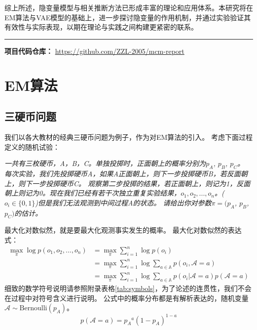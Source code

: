 \documentclass[12pt,a4paper]{article}
\begin{document}
综上所述，隐变量模型与相关推断方法已形成丰富的理论和应用体系。本研究将在EM算法与VAE模型的基础上，进一步探讨隐变量的作用机制，并通过实验验证其有效性与实际表现，以期在理论与实践之间构建更紧密的联系。
\vfill %
\noindent\rule{\textwidth}{0.4pt} %
\begin{center}
    \textbf{项目代码仓库：} \url{https://github.com/ZZL-2005/mcm-report}
\end{center}
\newpage
\section{EM算法}

\subsection{三硬币问题}
我们以各大教材的经典三硬币问题为例子，作为对EM算法的引入。
考虑下面过程定义的随机试验：
\begin{tcolorbox}[
    colback=gray!5,
    colframe=gray!40,
    boxrule=0.5pt,
    arc=3pt,
    left=8pt,
    right=8pt,
    top=6pt,
    bottom=6pt,
    fontupper=\small
]
\textit{
一共有三枚硬币，A，B，C。单独投掷时，正面朝上的概率分别为$p_A$, $p_B$, $p_C$。
每次实验，我们先投掷硬币A，如果A正面朝上，则下一步投掷硬币B，若反面朝上，则下一步投掷硬币C。
观察第二步投掷的结果，若正面朝上，则记为1，反面朝上则记为0。现在我们已经有若干次独立重复实验结果，$o_1,o_2,...,o_n$。($o_i \in \{0,1\}$)但是我们无法观测到中间过程A的状态。
请给出你对参数$\pi =(p_A$, $p_B$, $p_C)$的估计。
}

\end{tcolorbox}
最大化对数似然，就是要最大化观测事实发生的概率。
最大化对数似然的表达式：
\begin{equation}\label{eq:likelihood}
\begin{split}
\max_{\pi}\log p(o_1,o_2,...,o_n) &= \max_{\pi} \sum_{i=1}^n \log p(o_i) \\
&= \max_{\pi} \sum_{i=1}^n \log \sum_{a \in\mathbb{A}}p(o_i,\mathcal{A}=a)\\
&=\max_{\pi} \sum_{i=1}^n \log \sum_{a \in \mathbb{A}}p(o_i|\mathcal{A}=a)p(\mathcal{A}=a)
\end{split}
\end{equation}
细致的数学符号说明请参照附录表格\ref{tab:symbols}，为了论述的连贯性，我们不会在过程中对符号含义进行说明。
公式中的概率分布都是有解析表达的，随机变量$\mathcal{A}\sim \text{Bernoulli}(p_A)$。
\begin{equation}\label{eq:prior}
    p(\mathcal{A}=a)={p_A}^a{(1-p_A)^{1-a}}
\end{equation}
\end{document}
